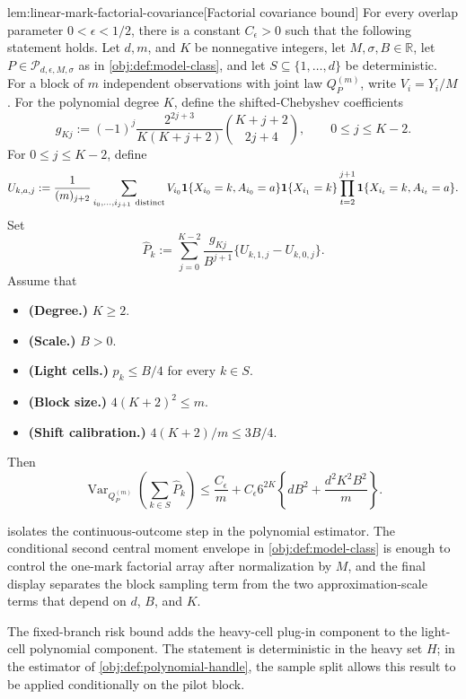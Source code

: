 \begin{lemmav}{lem:linear-mark-factorial-covariance}[Factorial covariance bound]
For every overlap parameter \(0<\epsilon<1/2\), there is a constant \(C_{\epsilon}>0\) such that the following statement holds.  Let \(d,m\), and \(K\) be nonnegative integers, let \(M,\sigma,B\in\mathbb R\), let \(P\in\mathcal P_{d,\epsilon,M,\sigma}\) as in \cref{obj:def:model-class}, and let \(S\subseteq\{1,\ldots,d\}\) be deterministic.  For a block of \(m\) independent observations with joint law \(Q_P^{(m)}\), write \(V_i=Y_i/M\).  For the polynomial degree \(K\), define the shifted-Chebyshev coefficients
\[
g_{Kj}
:=
(-1)^j\frac{2^{2j+3}}{K(K+j+2)}
\binom{K+j+2}{2j+4},
\qquad 0\le j\le K-2.
\]
For \(0\le j\le K-2\), define
\[
U_{k,a,j}
:=
\frac{1}{(m)_{j+2}}
\sum_{i_0,\ldots,i_{j+1}\ {\rm distinct}}
V_{i_0}\mathbf 1\{X_{i_0}=k,A_{i_0}=a\}
\mathbf 1\{X_{i_1}=k\}
\prod_{t=2}^{j+1}\mathbf 1\{X_{i_t}=k,A_{i_t}=a\}.
\]
Set
\[
\widehat P_k
:=
\sum_{j=0}^{K-2}
\frac{g_{Kj}}{B^{j+1}}
\{U_{k,1,j}-U_{k,0,j}\}.
\]
Assume that
\begin{itemize}
\item \textbf{(Degree.)} \(K\ge 2\).
\item \textbf{(Scale.)} \(B>0\).
\item \textbf{(Light cells.)} \(p_k\le B/4\) for every \(k\in S\).
\item \textbf{(Block size.)} \(4(K+2)^2\le m\).
\item \textbf{(Shift calibration.)} \(4(K+2)/m\le 3B/4\).
\end{itemize}
Then
\[
\operatorname{Var}_{Q_P^{(m)}}\!\left(\sum_{k\in S}\widehat P_k\right)
\le
\frac{C_{\epsilon}}{m}
+
C_{\epsilon}6^{2K}
\left\{
dB^2+\frac{d^2K^2B^2}{m}
\right\}.
\]
\end{lemmav}

 isolates the continuous-outcome step in the polynomial estimator. The conditional second central moment envelope in \cref{obj:def:model-class} is enough to control the one-mark factorial array after normalization by \(M\), and the final display separates the block sampling term from the two approximation-scale terms that depend on \(d\), \(B\), and \(K\).

The fixed-branch risk bound adds the heavy-cell plug-in component to the light-cell polynomial component. The statement is deterministic in the heavy set \(H\); in the estimator of \cref{obj:def:polynomial-handle}, the sample split allows this result to be applied conditionally on the pilot block.

